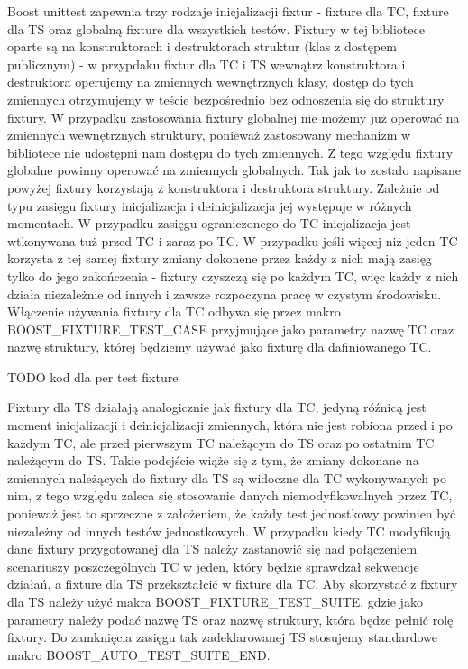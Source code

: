 Boost unittest zapewnia trzy rodzaje inicjalizacji fixtur - fixture dla TC, fixture dla TS oraz globalną fixture dla wszystkich testów. Fixtury w tej bibliotece oparte są na konstruktorach i destruktorach struktur (klas z dostępem publicznym) - w przypdaku fixtur dla TC i TS wewnątrz konstruktora i destruktora operujemy na zmiennych wewnętrznych klasy, dostęp do tych zmiennych otrzymujemy w teście bezpośrednio bez odnoszenia się do struktury fixtury.
W przypadku zastosowania fixtury globalnej nie możemy już operować na zmiennych wewnętrznych struktury, ponieważ zastosowany mechanizm w bibliotece nie udostępni nam dostępu do tych zmiennych. Z tego względu fixtury globalne powinny operować na zmiennych globalnych.
Tak jak to zostało napisane powyżej fixtury korzystają z konstruktora i destruktora struktury. Zależnie od typu zasięgu fixtury inicjalizacja i deinicjalizacja jej występuje w różnych momentach. W przypadku zasięgu ograniczonego do TC inicjalizacja jest wtkonywana tuż przed TC i zaraz po TC. W przypadku jeśli więcej niż jeden TC korzysta z tej samej fixtury zmiany dokonene przez każdy z nich mają zasięg tylko do jego zakończenia - fixtury czyszczą się po każdym TC, więc każdy z nich działa niezależnie od innych i zawsze rozpoczyna pracę w czystym środowisku.
Włączenie używania fixtury dla TC odbywa się przez makro BOOST_FIXTURE_TEST_CASE przyjmujące jako parametry nazwę TC oraz nazwę struktury, której będziemy używać jako fixturę dla dafiniowanego TC.

TODO kod dla per test fixture

Fixtury dla TS działają analogicznie jak fixtury dla TC, jedyną róźnicą jest moment inicjalizacji i deinicjalizacji zmiennych, która nie jest robiona przed i po każdym TC, ale przed pierwszym TC należącym do TS oraz po ostatnim TC należącym do TS.
Takie podejście wiąże się z tym, że zmiany dokonane na zmiennych należących do fixtury dla TS są widoczne dla TC wykonywanych po nim, z tego względu zaleca się stosowanie danych niemodyfikowalnych przez TC, ponieważ jest to sprzeczne z założeniem, że każdy test jednostkowy powinien być niezależny od innych testów jednostkowych.
W przypadku kiedy TC modyfikują dane fixtury przygotowanej dla TS należy zastanowić się nad połączeniem scenariuszy poszczególnych TC w jeden, który będzie sprawdzał sekwencje działań, a fixture dla TS przekształcić w fixture dla TC.
Aby skorzystać z fixtury dla TS należy użyć makra BOOST_FIXTURE_TEST_SUITE, gdzie jako parametry należy podać nazwę TS oraz nazwę struktury, która będze pełnić rolę fixtury. Do zamknięcia zasięgu tak zadeklarowanej TS stosujemy standardowe makro BOOST_AUTO_TEST_SUITE_END.

